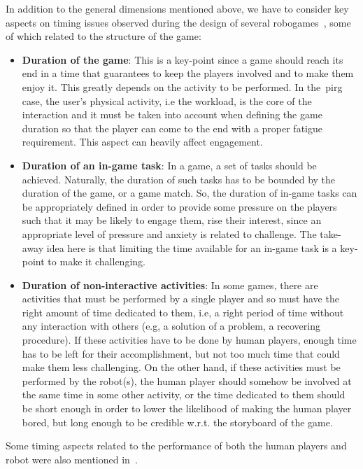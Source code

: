 In addition to the general dimensions mentioned above, we have to consider key aspects on timing issues observed during the design of several robogames~\cite{bonarini_timing_2014}, some of which related to the structure of the game:

\begin{itemize}
\item \textbf{Duration of the game}: This is a key-point since a game should reach its end in a time that guarantees to keep the players involved and to make them enjoy it. This greatly depends on the activity to be performed. In the~\gls{pirg} case, the user's physical activity, i.e the workload, is the core of the interaction and it must be taken into account when defining the game duration so that the player can come to the end with a proper fatigue requirement. This aspect can heavily affect engagement.

\item \textbf{Duration of an in-game task}: In a game, a set of tasks should be achieved. Naturally, the duration of such tasks has to be bounded by the duration of the game, or a game match. So, the duration of in-game tasks can be appropriately defined in order to provide some pressure on the players such that it may be likely to engage them, rise their interest, since an appropriate level of pressure and anxiety is related to challenge. The take-away idea here is that limiting the time available for an in-game task is a key-point to make it challenging.

\item \textbf{Duration of non-interactive activities}: In some games, there are activities that must be performed by a single player and so must have the right amount of time dedicated to them, i.e, a right period of time without any interaction with others (e.g, a solution of a problem, a recovering procedure). If these activities have to be done by human players, enough time has to be left for their accomplishment, but not too much time that could make them less challenging. On the other hand, if these activities must be performed by the robot(s), the human player should somehow be involved at the same time in some other activity, or the time dedicated to them should be short enough in order to lower the likelihood of making the human player bored, but long enough to be credible w.r.t. the storyboard of the game.
\end{itemize}

Some timing aspects related to the performance of both the human players and robot were also mentioned in~\cite{bonarini_timing_2014}.

